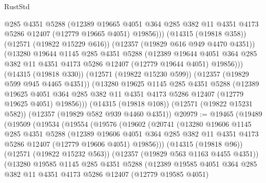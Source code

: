 \begin{lexlean}{RustStd}
\begin{coremodule}
            @285
            @4351
            @5288
            (@12389
              @19665
              @4051
              @364
              @285
              @382
              @11
              @4351
              @4173
              @5286
              @12407
              (@12779 @19665 @4051)
              @19856)))
        (@14315 (@19818 @358))
        (@12571 (@19822 @15229 @616))
        (@12357 (@19829 @616 @949 @4470 @4351))
        (@13280
          @19644
          @1145
          @285
          @4351
          @5288
          (@12389
            @19644
            @4051
            @364
            @285
            @382
            @11
            @4351
            @4173
            @5286
            @12407
            (@12779 @19644 @4051)
            @19856)))
      (@14315 (@19818 @330))
      (@12571 (@19822 @15230 @599))
      (@12357 (@19829 @599 @945 @4465 @4351))
      (@13280
        @19625
        @1145
        @285
        @4351
        @5288
        (@12389
          @19625
          @4051
          @364
          @285
          @382
          @11
          @4351
          @4173
          @5286
          @12407
          (@12779 @19625 @4051)
          @19856)))
    (@14315 (@19818 @108))
    (@12571 (@19822 @15231 @582))
    (@12357 (@19829 @582 @939 @4460 @4351))
@20979 := @19465
    (@19489
      (@19509
        (@19534
          (@19554
            (@19576
              (@19602
                (@20741
                  (@13280
                    @19606
                    @1145
                    @285
                    @4351
                    @5288
                    (@12389
                      @19606
                      @4051
                      @364
                      @285
                      @382
                      @11
                      @4351
                      @4173
                      @5286
                      @12407
                      (@12779 @19606 @4051)
                      @19856)))
                (@14315 (@19818 @96))
                (@12571 (@19822 @15232 @563))
                (@12357 (@19829 @563 @1163 @4455 @4351))
                (@13280
                  @19585
                  @1145
                  @285
                  @4351
                  @5288
                  (@12389
                    @19585
                    @4051
                    @364
                    @285
                    @382
                    @11
                    @4351
                    @4173
                    @5286
                    @12407
                    (@12779 @19585 @4051)

\end{coremodule}
\end{lexlean}
